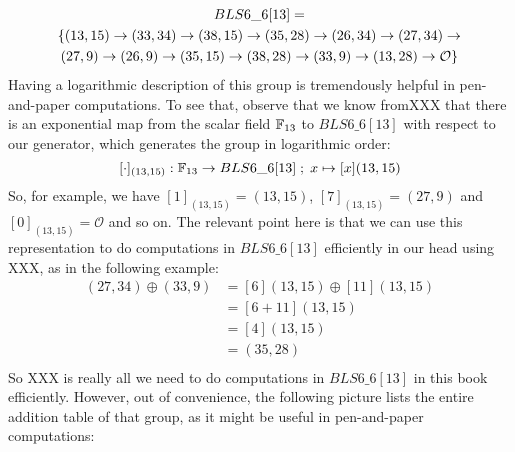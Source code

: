 \begin{multline}
BLS6\_6[13]=\\
\{(13,15) \rightarrow (33,34) \rightarrow  (38,15) \rightarrow  (35,28) \rightarrow (26,34) \rightarrow  (27,34) \rightarrow  \\ 
(27,9)  \rightarrow  (26,9) \rightarrow  (35,15) \rightarrow  (38,28) \rightarrow  (33,9) \rightarrow (13,28) \rightarrow  \mathcal{O}\}$$
\end{multline}
Having a logarithmic description of this group is tremendously helpful in pen-and-paper computations. To see that, observe that we know fromXXX that there is an exponential map from the scalar field $\mathbb{F}_{13}$ to $BLS6\_6[13]$ with respect to our generator, which generates the group in logarithmic order:
$$
[\cdot]_{(13,15)}: \mathbb{F}_{13} \to BLS6\_6[13]\;;\; x \mapsto [x](13,15)
$$
 So, for example, we have $[1]_{(13,15)}= (13,15)$, $[7]_{(13,15)}= (27,9)$ and $[0]_{(13,15)}= \mathcal{O}$ and so on. The relevant point here is that we can use this representation to do computations in $BLS6\_6[13]$ efficiently in our head using XXX, as in the following example:
\begin{align*}
(27,34)\oplus (33,9)  & = [6](13,15)\oplus [11](13,15)\\
                      & = [6+11](13,15)\\
                      & = [4](13,15)\\
                      & = (35,28)\\
\end{align*}
So XXX is really all we need to do computations in $BLS6\_6[13]$ in this book efficiently. However, out of convenience, the following picture lists the entire addition table of that group, as it might be useful in pen-and-paper computations:
\begingroup
    \fontsize{7pt}{7pt}\selectfont
